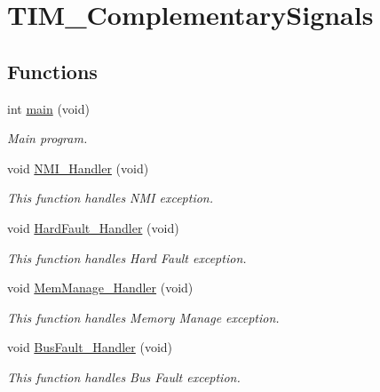 \hypertarget{group___t_i_m___complementary_signals}{\section{T\-I\-M\-\_\-\-Complementary\-Signals}
\label{group___t_i_m___complementary_signals}
}
\subsection*{Functions}
\begin{DoxyCompactItemize}
\item 
int \hyperlink{group___t_i_m___complementary_signals_ga840291bc02cba5474a4cb46a9b9566fe}{main} (void)
\begin{DoxyCompactList}\small\item\em Main program. \end{DoxyCompactList}\item 
void \hyperlink{group___t_i_m___complementary_signals_ga6ad7a5e3ee69cb6db6a6b9111ba898bc}{N\-M\-I\-\_\-\-Handler} (void)
\begin{DoxyCompactList}\small\item\em This function handles N\-M\-I exception. \end{DoxyCompactList}\item 
void \hyperlink{group___t_i_m___complementary_signals_ga2bffc10d5bd4106753b7c30e86903bea}{Hard\-Fault\-\_\-\-Handler} (void)
\begin{DoxyCompactList}\small\item\em This function handles Hard Fault exception. \end{DoxyCompactList}\item 
void \hyperlink{group___t_i_m___complementary_signals_ga3150f74512510287a942624aa9b44cc5}{Mem\-Manage\-\_\-\-Handler} (void)
\begin{DoxyCompactList}\small\item\em This function handles Memory Manage exception. \end{DoxyCompactList}\item 
void \hyperlink{group___t_i_m___complementary_signals_ga850cefb17a977292ae5eb4cafa9976c3}{Bus\-Fault\-\_\-\-Handler} (void)
\begin{DoxyCompactList}\small\item\em This function handles Bus Fault exception. \end{DoxyCompactList}\item 

\end{DoxyCompactItemize}
